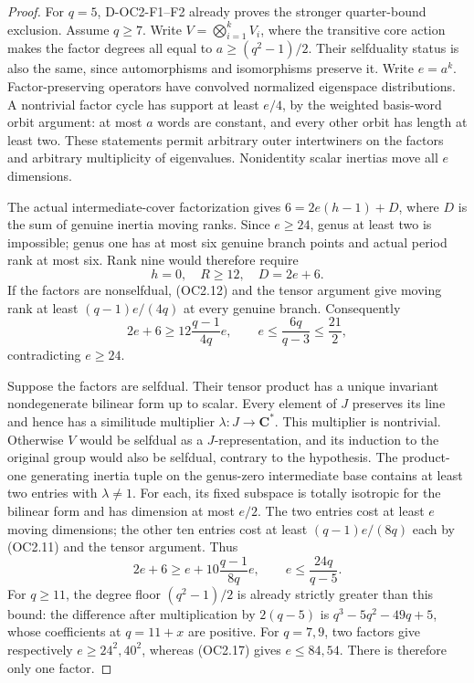 \begin{proof}
For $q=5$, D-OC2-F1--F2 already proves the stronger quarter-bound
exclusion. Assume $q\ge7$. Write $V=\bigotimes_{i=1}^k V_i$,
where the transitive core action makes the factor degrees all
equal to $a\ge(q^2-1)/2$. Their selfduality status is also the
same, since automorphisms and isomorphisms preserve it.
Write $e=a^k$. Factor-preserving operators have convolved
normalized eigenspace distributions. A nontrivial factor cycle
has support at least $e/4$, by the weighted basis-word orbit
argument: at most $a$ words are constant, and every other orbit
has length at least two. These statements permit arbitrary
outer intertwiners on the factors and arbitrary multiplicity
of eigenvalues. Nonidentity scalar inertias move all $e$
dimensions.

The actual intermediate-cover factorization gives
$6=2e(h-1)+D$, where $D$ is the sum of genuine inertia moving
ranks. Since $e\ge24$, genus at least two is impossible; genus
one has at most six genuine branch points and actual period
rank at most six. Rank nine would therefore require
\[
                    h=0,\quad R\ge12,\quad D=2e+6.
                                                               \tag{OC2.15}
\]
If the factors are nonselfdual, (OC2.12) and the tensor argument
give moving rank at least $(q-1)e/(4q)$ at every genuine branch.
Consequently
\[
 2e+6\ge12\frac{q-1}{4q}e,
       \qquad e\le\frac{6q}{q-3}\le\frac{21}2,
                                                               \tag{OC2.16}
\]
contradicting $e\ge24$.

Suppose the factors are selfdual. Their tensor product has a
unique invariant nondegenerate bilinear form up to scalar.
Every element of $J$ preserves its line and hence has a
similitude multiplier $\lambda:J\to\mathbf C^*$.
This multiplier is nontrivial. Otherwise $V$ would be selfdual
as a $J$-representation, and its induction to the original
group would also be selfdual, contrary to the hypothesis.
The product-one generating inertia tuple on the genus-zero
intermediate base contains at least two entries with
$\lambda\ne1$. For each, its fixed subspace is totally
isotropic for the bilinear form and has dimension at most
$e/2$. The two entries cost at least $e$ moving dimensions;
the other ten entries cost at least $(q-1)e/(8q)$ each by
(OC2.11) and the tensor argument. Thus
\[
 2e+6\ge e+10\frac{q-1}{8q}e,
                    \qquad e\le\frac{24q}{q-5}.              \tag{OC2.17}
\]
For $q\ge11$, the degree floor $(q^2-1)/2$ is already
strictly greater than this bound: the difference after
multiplication by $2(q-5)$ is
$q^3-5q^2-49q+5$, whose coefficients at $q=11+x$ are
positive. For $q=7,9$, two factors give respectively
$e\ge24^2,40^2$, whereas (OC2.17) gives $e\le84,54$.
There is therefore only one factor.


\end{proof}
